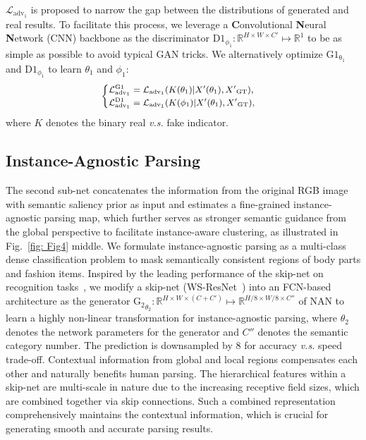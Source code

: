 \documentclass[10pt,twocolumn,letterpaper]{article}
\theoremstyle{definition}
\theoremstyle{remark}
\begin{document}
$\mathcal{L}_{\mathrm{adv}_1}$ is proposed to narrow the gap between the distributions of generated and real results. To facilitate this process, we leverage a \textbf{C}onvolutional \textbf{N}eural \textbf{N}etwork (CNN) backbone as the discriminator $\mathrm{D1}_{\phi_1}: \mathbb{R}^{H \times W \times C{'}} \mapsto \mathbb{R}^{1}$ to be as simple as possible to avoid typical GAN tricks. We alternatively optimize $\mathrm{G1_{\theta_1}}$ and $\mathrm{D1}_{\phi_1}$ to learn $\theta_1$ and $\phi_1$:
\begin{equation}
\small
\begin{cases}
\mathcal{L}_{\mathrm{adv}_1}^{\mathrm{G1}} = \mathcal{L}_{\mathrm{adv}_1}(K(\theta_1)|X{'}(\theta_1), X{'}_{\mathrm{GT}}), \\
\mathcal{L}_{\mathrm{adv}_1}^{\mathrm{D1}} = \mathcal{L}_{\mathrm{adv}_1}(K(\phi_1)|X{'}(\theta_1), X{'}_{\mathrm{GT}}),
\end{cases}
\end{equation}
where $K$ denotes the binary real \emph{v.s.} fake indicator.

\subsection{Instance-Agnostic Parsing}

The second sub-net concatenates the information from the original RGB image with semantic saliency prior as input and estimates a fine-grained instance-agnostic parsing map, which further serves as stronger semantic guidance from the global perspective to facilitate instance-aware clustering, as illustrated in Fig.~\ref{fig: Fig4} middle. We formulate instance-agnostic parsing as a multi-class dense classification problem to mask semantically consistent regions of body parts and fashion items. Inspired by the leading performance of the skip-net on recognition tasks~\cite{wu2016wider, he2016deep}, we modify a skip-net (WS-ResNet~\cite{wu2016wider}) into an FCN-based architecture as the generator $\mathrm{G_2}_{\theta_2} : \mathbb{R}^{H \times W \times (C+C{'})} \mapsto \mathbb{R}^{H/8 \times W/8 \times C{''}}$ of NAN to learn a highly non-linear transformation for instance-agnostic parsing, where $\theta_2$ denotes the network parameters for the generator and $C{''}$ denotes the semantic category number. The prediction is downsampled by $8$ for accuracy \emph{v.s.} speed trade-off. Contextual information from global and local regions compensates each other and naturally benefits human parsing. The hierarchical features within a skip-net are multi-scale in nature due to the increasing receptive field sizes, which are combined together via skip connections. Such a combined representation comprehensively maintains the contextual information, which is crucial for generating smooth and accurate parsing results.
\end{document}
